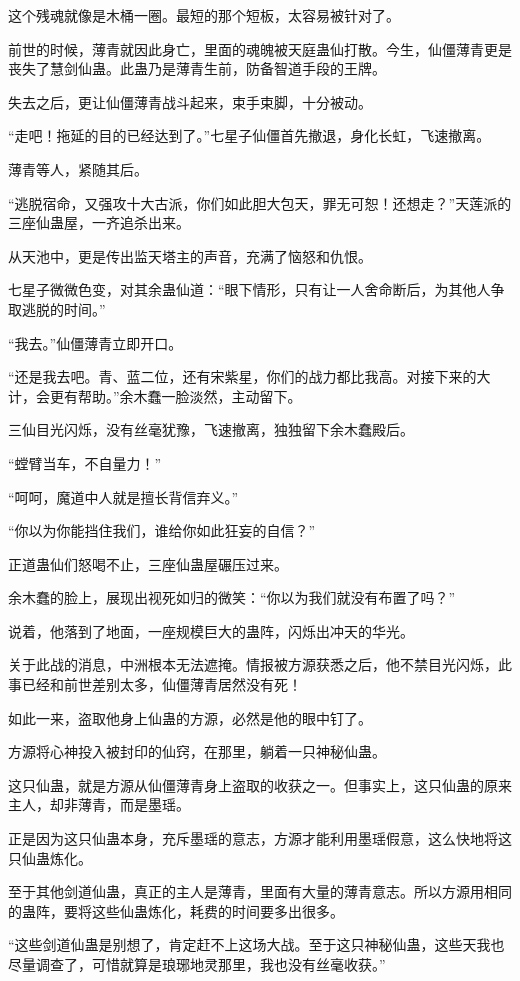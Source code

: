 \begin{this_body}
这个残魂就像是木桶一圈。最短的那个短板，太容易被针对了。

前世的时候，薄青就因此身亡，里面的魂魄被天庭蛊仙打散。今生，仙僵薄青更是丧失了慧剑仙蛊。此蛊乃是薄青生前，防备智道手段的王牌。

失去之后，更让仙僵薄青战斗起来，束手束脚，十分被动。

“走吧！拖延的目的已经达到了。”七星子仙僵首先撤退，身化长虹，飞速撤离。

薄青等人，紧随其后。

“逃脱宿命，又强攻十大古派，你们如此胆大包天，罪无可恕！还想走？”天莲派的三座仙蛊屋，一齐追杀出来。

从天池中，更是传出监天塔主的声音，充满了恼怒和仇恨。

七星子微微色变，对其余蛊仙道：“眼下情形，只有让一人舍命断后，为其他人争取逃脱的时间。”

“我去。”仙僵薄青立即开口。

“还是我去吧。青、蓝二位，还有宋紫星，你们的战力都比我高。对接下来的大计，会更有帮助。”余木蠢一脸淡然，主动留下。

三仙目光闪烁，没有丝毫犹豫，飞速撤离，独独留下余木蠢殿后。

“螳臂当车，不自量力！”

“呵呵，魔道中人就是擅长背信弃义。”

“你以为你能挡住我们，谁给你如此狂妄的自信？”

正道蛊仙们怒喝不止，三座仙蛊屋碾压过来。

余木蠢的脸上，展现出视死如归的微笑：“你以为我们就没有布置了吗？”

说着，他落到了地面，一座规模巨大的蛊阵，闪烁出冲天的华光。

关于此战的消息，中洲根本无法遮掩。情报被方源获悉之后，他不禁目光闪烁，此事已经和前世差别太多，仙僵薄青居然没有死！

如此一来，盗取他身上仙蛊的方源，必然是他的眼中钉了。

方源将心神投入被封印的仙窍，在那里，躺着一只神秘仙蛊。

这只仙蛊，就是方源从仙僵薄青身上盗取的收获之一。但事实上，这只仙蛊的原来主人，却非薄青，而是墨瑶。

正是因为这只仙蛊本身，充斥墨瑶的意志，方源才能利用墨瑶假意，这么快地将这只仙蛊炼化。

至于其他剑道仙蛊，真正的主人是薄青，里面有大量的薄青意志。所以方源用相同的蛊阵，要将这些仙蛊炼化，耗费的时间要多出很多。

“这些剑道仙蛊是别想了，肯定赶不上这场大战。至于这只神秘仙蛊，这些天我也尽量调查了，可惜就算是琅琊地灵那里，我也没有丝毫收获。”


\end{this_body}
